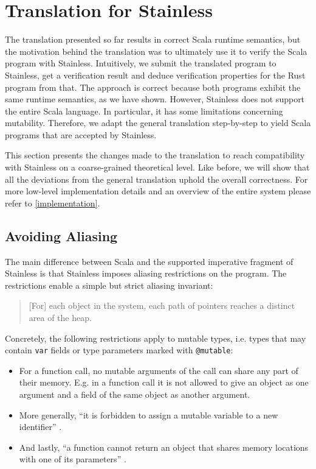\section{Translation for Stainless}

The translation presented so far results in correct Scala runtime semantics, but
the motivation behind the translation was to ultimately use it to verify the
Scala program with Stainless. Intuitively, we submit the translated program to
Stainless, get a verification result and deduce verification properties for the
Rust program from that. The approach is correct because both programs exhibit
the same runtime semantics, as we have shown. However, Stainless does not
support the entire Scala language. In particular, it has some limitations
concerning mutability. Therefore, we adapt the general translation step-by-step
to yield Scala programs that are accepted by Stainless.

This section presents the changes made to the translation to reach compatibility
with Stainless on a coarse-grained theoretical level. Like before, we will show
that all the deviations from the general translation uphold the overall
correctness. For more low-level implementation details and an overview of the
entire system please refer to \autoref{implementation}.



\subsection{Avoiding Aliasing}
\label{sec:aliasing-restrictions}

The main difference between Scala and the supported imperative fragment of
Stainless \cite[section ``Imperative'']{stainless-doc} is that Stainless imposes
aliasing restrictions on the program. The restrictions enable a simple but
strict aliasing invariant:

\begin{quote}
{[}For{]} each object in the system, each path of pointers reaches a
distinct area of the heap. \cite[p.~59]{regb}
\end{quote}

Concretely, the following restrictions apply to mutable types, i.e. types that
may contain \lstinline!var! fields or type parameters marked with
\lstinline!@mutable!:

\begin{itemize}
\tightlist
\item
  For a function call, no mutable arguments of the call can share any
  part of their memory. E.g. in a function call it is not allowed to
  give an object as one argument and a field of the same object as
  another argument.
\item
  More generally, ``it is forbidden to assign a mutable variable to a
  new identifier'' \cite[p.~59]{regb}.
\item
  And lastly, ``a function cannot return an object that shares memory
  locations with one of its parameters'' \cite[p.~59]{regb}.
\end{itemize}

